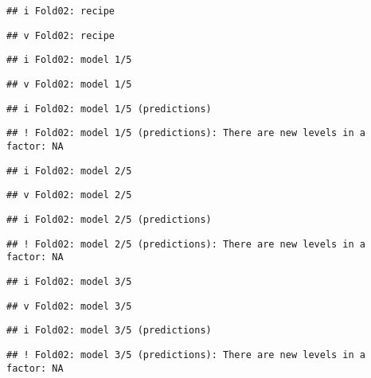 \documentclass[
]{article}
\begin{document}
\begin{verbatim}
## i Fold02: recipe
\end{verbatim}

\begin{verbatim}
## v Fold02: recipe
\end{verbatim}

\begin{verbatim}
## i Fold02: model 1/5
\end{verbatim}

\begin{verbatim}
## v Fold02: model 1/5
\end{verbatim}

\begin{verbatim}
## i Fold02: model 1/5 (predictions)
\end{verbatim}

\begin{verbatim}
## ! Fold02: model 1/5 (predictions): There are new levels in a factor: NA
\end{verbatim}

\begin{verbatim}
## i Fold02: model 2/5
\end{verbatim}

\begin{verbatim}
## v Fold02: model 2/5
\end{verbatim}

\begin{verbatim}
## i Fold02: model 2/5 (predictions)
\end{verbatim}

\begin{verbatim}
## ! Fold02: model 2/5 (predictions): There are new levels in a factor: NA
\end{verbatim}

\begin{verbatim}
## i Fold02: model 3/5
\end{verbatim}

\begin{verbatim}
## v Fold02: model 3/5
\end{verbatim}

\begin{verbatim}
## i Fold02: model 3/5 (predictions)
\end{verbatim}

\begin{verbatim}
## ! Fold02: model 3/5 (predictions): There are new levels in a factor: NA
\end{verbatim}
\end{document}
